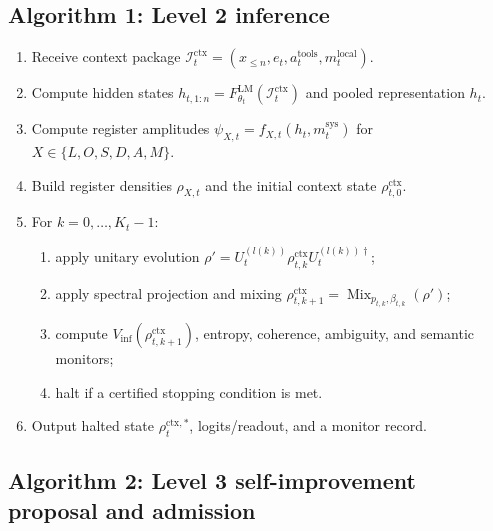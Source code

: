 \documentclass[11pt,a4paper]{article}
\newcommand{\sys}{\mathrm{sys}}
\newcommand{\ctx}{\mathrm{ctx}}
\newcommand{\LM}{\mathrm{LM}}
\newcommand{\tools}{\mathrm{tools}}
\newcommand{\local}{\mathrm{local}}
\begin{document}
\subsection{Algorithm 1: Level 2 inference}

\begin{enumerate}[label=\textbf{I\arabic*.}, leftmargin=2em]
    \item Receive context package \(\mathcal I_t^{\ctx}=(x_{\le n},e_t,a_t^{\tools},m_t^{\local})\).
    \item Compute hidden states \(h_{t,1:n}=F_{\theta_t}^{\LM}(\mathcal I_t^{\ctx})\) and pooled representation \(h_t\).
    \item Compute register amplitudes \(\psi_{X,t}=f_{X,t}(h_t,m_t^{\sys})\) for \(X\in\{L,O,S,D,A,M\}\).
    \item Build register densities \(\rho_{X,t}\) and the initial context state \(\rho_{t,0}^{\ctx}\).
    \item For \(k=0,\ldots,K_t-1\):
    \begin{enumerate}[label=\textbf{I5.\alph*.}, leftmargin=2em]
        \item apply unitary evolution \(\rho' = U_t^{(l(k))}\rho_{t,k}^{\ctx}U_t^{(l(k))\dagger}\);
        \item apply spectral projection and mixing \(\rho_{t,k+1}^{\ctx}=\operatorname{Mix}_{p_{t,k},\beta_{t,k}}(\rho')\);
        \item compute \(V_{\mathrm{inf}}(\rho_{t,k+1}^{\ctx})\), entropy, coherence, ambiguity, and semantic monitors;
        \item halt if a certified stopping condition is met.
    \end{enumerate}
    \item Output halted state \(\rho_t^{\ctx,*}\), logits/readout, and a monitor record.
\end{enumerate}

\subsection{Algorithm 2: Level 3 self-improvement proposal and admission}
\end{document}
